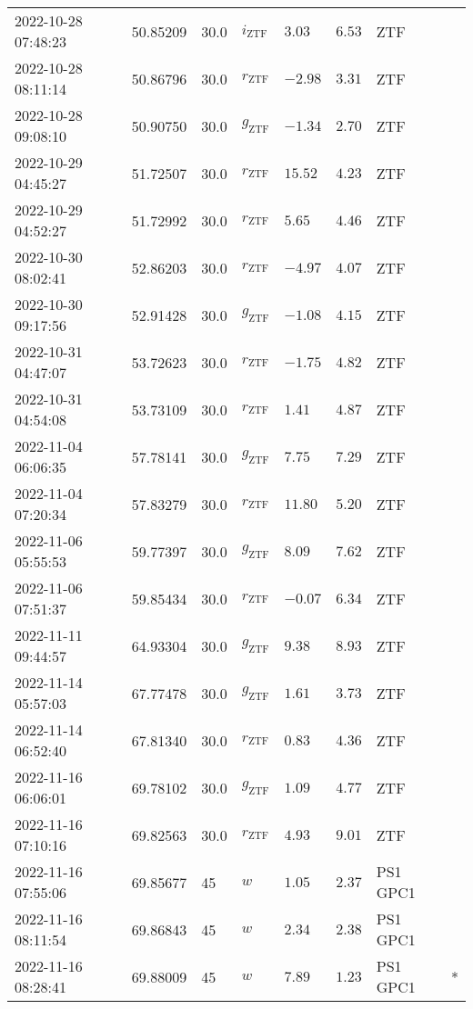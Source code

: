 \documentclass{nature_plusfigure}
\begin{document}
\begin{supplement}
\begin{center}
\begin{longtable}{llllllll}
2022-10-28 07:48:23 & 50.85209 & 30.0 & ${i}_\mathrm{ZTF}$ & $3.03$ & $6.53$ & ZTF &  \\ 
2022-10-28 08:11:14 & 50.86796 & 30.0 & ${r}_\mathrm{ZTF}$ & $-2.98$ & $3.31$ & ZTF &  \\ 
2022-10-28 09:08:10 & 50.90750 & 30.0 & ${g}_\mathrm{ZTF}$ & $-1.34$ & $2.70$ & ZTF &  \\ 
2022-10-29 04:45:27 & 51.72507 & 30.0 & ${r}_\mathrm{ZTF}$ & $15.52$ & $4.23$ & ZTF &  \\ 
2022-10-29 04:52:27 & 51.72992 & 30.0 & ${r}_\mathrm{ZTF}$ & $5.65$ & $4.46$ & ZTF &  \\ 
2022-10-30 08:02:41 & 52.86203 & 30.0 & ${r}_\mathrm{ZTF}$ & $-4.97$ & $4.07$ & ZTF &  \\ 
2022-10-30 09:17:56 & 52.91428 & 30.0 & ${g}_\mathrm{ZTF}$ & $-1.08$ & $4.15$ & ZTF &  \\ 
2022-10-31 04:47:07 & 53.72623 & 30.0 & ${r}_\mathrm{ZTF}$ & $-1.75$ & $4.82$ & ZTF &  \\ 
2022-10-31 04:54:08 & 53.73109 & 30.0 & ${r}_\mathrm{ZTF}$ & $1.41$ & $4.87$ & ZTF &  \\ 
2022-11-04 06:06:35 & 57.78141 & 30.0 & ${g}_\mathrm{ZTF}$ & $7.75$ & $7.29$ & ZTF &  \\ 
2022-11-04 07:20:34 & 57.83279 & 30.0 & ${r}_\mathrm{ZTF}$ & $11.80$ & $5.20$ & ZTF &  \\ 
2022-11-06 05:55:53 & 59.77397 & 30.0 & ${g}_\mathrm{ZTF}$ & $8.09$ & $7.62$ & ZTF &  \\ 
2022-11-06 07:51:37 & 59.85434 & 30.0 & ${r}_\mathrm{ZTF}$ & $-0.07$ & $6.34$ & ZTF &  \\ 
2022-11-11 09:44:57 & 64.93304 & 30.0 & ${g}_\mathrm{ZTF}$ & $9.38$ & $8.93$ & ZTF &  \\ 
2022-11-14 05:57:03 & 67.77478 & 30.0 & ${g}_\mathrm{ZTF}$ & $1.61$ & $3.73$ & ZTF &  \\ 
2022-11-14 06:52:40 & 67.81340 & 30.0 & ${r}_\mathrm{ZTF}$ & $0.83$ & $4.36$ & ZTF &  \\ 
2022-11-16 06:06:01 & 69.78102 & 30.0 & ${g}_\mathrm{ZTF}$ & $1.09$ & $4.77$ & ZTF &  \\ 
2022-11-16 07:10:16 & 69.82563 & 30.0 & ${r}_\mathrm{ZTF}$ & $4.93$ & $9.01$ & ZTF &  \\ 
2022-11-16 07:55:06 & 69.85677 & 45 & $w$ & $1.05$ & $2.37$ & PS1 GPC1 &  \\ 
2022-11-16 08:11:54 & 69.86843 & 45 & $w$ & $2.34$ & $2.38$ & PS1 GPC1 &  \\ 
2022-11-16 08:28:41 & 69.88009 & 45 & $w$ & $7.89$ & $1.23$ & PS1 GPC1 & * \\ 

\end{longtable}
\end{center}
\end{supplement}
\end{document}

